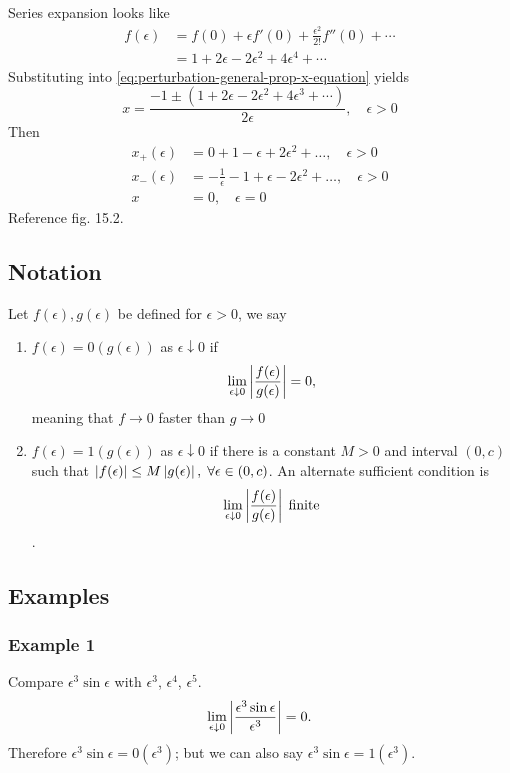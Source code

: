 \documentclass[12pt,twoside]{article}
\begin{document}
Series expansion looks like
\begin{equation*}
  \begin{aligned}
    f(\epsilon) &= f(0) + \epsilon f'(0) + \frac{\epsilon^2}{2!}f''(0)+\cdots \\
    &= 1 + 2\epsilon - 2\epsilon^2 + 4\epsilon^4 + \cdots
  \end{aligned}
\end{equation*}
Substituting into \cref{eq:perturbation-general-prop-x-equation} yields
\begin{equation*}
  x = \frac{-1\pm(1+2\epsilon-2\epsilon^2+4\epsilon^3+\cdots)}{2\epsilon},\quad \epsilon>0
\end{equation*}
Then
\begin{equation*}
  \begin{aligned}
    x_+(\epsilon) &= 0 + 1 - \epsilon + 2\epsilon^2+\ldots, \quad \epsilon>0 \\
    x_-(\epsilon) &= -\frac{1}{\epsilon}-1+\epsilon-2\epsilon^2+\ldots,\quad\epsilon>0 \\
    x&=0,\quad \epsilon=0
  \end{aligned}
\end{equation*}
Reference fig. 15.2.

\subsection{Notation}
Let $f(\epsilon),g(\epsilon)$ be defined for $\epsilon>0$, we say
\begin{enumerate}
\item $f(\epsilon)= 0(g(\epsilon))$ as $\epsilon\downarrow0$ if
$$\lim_{\epsilon\downarrow0}\left|{\frac{f(\epsilon)}{g(\epsilon)}}\right|=0,$$ meaning
that $f\rightarrow0$ faster than $g\rightarrow0$
\item $f(\epsilon)=1(g(\epsilon))$ as $\epsilon\downarrow0$ if there is a
  constant $M>0$ and interval $(0,c)$ such that $\left|{f(\epsilon)}\right|\le
  M\left|{g(\epsilon)}\right|,\;\forall\epsilon\in(0,c)$. An alternate sufficient
  condition
  is $$\lim_{\epsilon\downarrow0}\left|{\frac{f(\epsilon)}{g(\epsilon)}}\right|\;\text{finite}$$.
\end{enumerate}

\subsection{Examples}
\subsubsection{Example 1}
Compare $\epsilon^3\sin\epsilon$ with $\epsilon^3$, $\epsilon^4$, $\epsilon^5$.
$$\lim_{\epsilon\downarrow0}\left|{\frac{\epsilon^3\sin\epsilon}{\epsilon^3}}\right|=0.$$
Therefore $\epsilon^3\sin\epsilon=0(\epsilon^3)$; but we can also say
$\epsilon^3\sin\epsilon=1(\epsilon^3)$.
\end{document}
